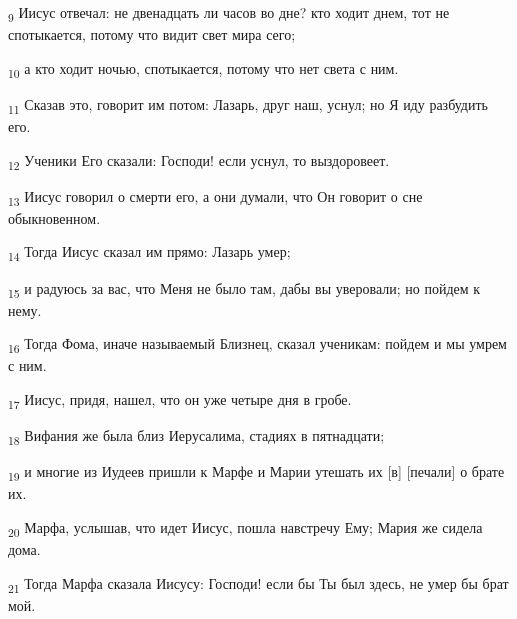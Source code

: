 \begin{tcolorbox}
\textsubscript{9} Иисус отвечал: не двенадцать ли часов во дне? кто ходит днем, тот не спотыкается, потому что видит свет мира сего;
\end{tcolorbox}
\begin{tcolorbox}
\textsubscript{10} а кто ходит ночью, спотыкается, потому что нет света с ним.
\end{tcolorbox}
\begin{tcolorbox}
\textsubscript{11} Сказав это, говорит им потом: Лазарь, друг наш, уснул; но Я иду разбудить его.
\end{tcolorbox}
\begin{tcolorbox}
\textsubscript{12} Ученики Его сказали: Господи! если уснул, то выздоровеет.
\end{tcolorbox}
\begin{tcolorbox}
\textsubscript{13} Иисус говорил о смерти его, а они думали, что Он говорит о сне обыкновенном.
\end{tcolorbox}
\begin{tcolorbox}
\textsubscript{14} Тогда Иисус сказал им прямо: Лазарь умер;
\end{tcolorbox}
\begin{tcolorbox}
\textsubscript{15} и радуюсь за вас, что Меня не было там, дабы вы уверовали; но пойдем к нему.
\end{tcolorbox}
\begin{tcolorbox}
\textsubscript{16} Тогда Фома, иначе называемый Близнец, сказал ученикам: пойдем и мы умрем с ним.
\end{tcolorbox}
\begin{tcolorbox}
\textsubscript{17} Иисус, придя, нашел, что он уже четыре дня в гробе.
\end{tcolorbox}
\begin{tcolorbox}
\textsubscript{18} Вифания же была близ Иерусалима, стадиях в пятнадцати;
\end{tcolorbox}
\begin{tcolorbox}
\textsubscript{19} и многие из Иудеев пришли к Марфе и Марии утешать их [в] [печали] о брате их.
\end{tcolorbox}
\begin{tcolorbox}
\textsubscript{20} Марфа, услышав, что идет Иисус, пошла навстречу Ему; Мария же сидела дома.
\end{tcolorbox}
\begin{tcolorbox}
\textsubscript{21} Тогда Марфа сказала Иисусу: Господи! если бы Ты был здесь, не умер бы брат мой.
\end{tcolorbox}
